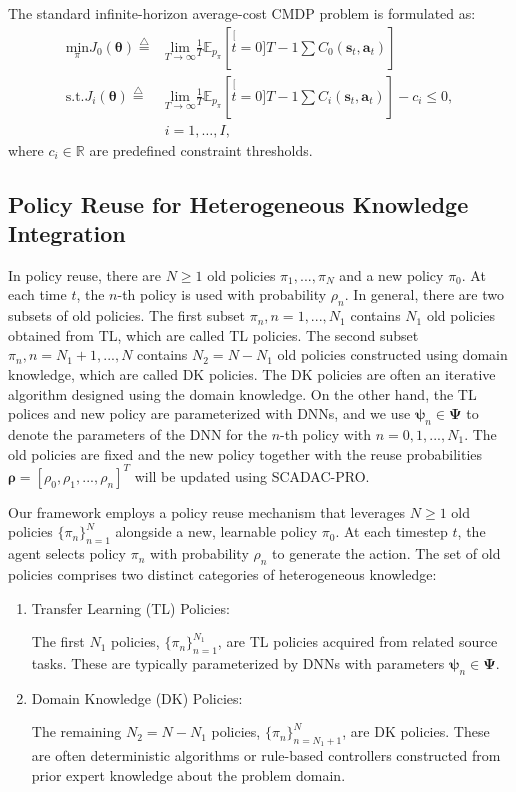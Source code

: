 \documentclass{IEEEtran}
\begin{document}
The standard infinite-horizon average-cost CMDP problem is formulated as:
\begin{align}
\underset{\pi}{\mathrm{min}}J_{0}\left(\boldsymbol{\theta}\right)\overset{\triangle}{=} & \underset{T\rightarrow\infty}{\mathrm{lim}}\frac{1}{T}\mathbb{E}_{p_{\pi}}\left[\stackrel[t=0]{T-1}{\sum}C_{0}\left(\boldsymbol{s}_{t},\boldsymbol{a}_{t}\right)\right]\label{eq:problem 1}\\
\mathrm{s.t.}J_{i}\left(\boldsymbol{\theta}\right)\overset{\triangle}{=} & \underset{T\rightarrow\infty}{\mathrm{lim}}\frac{1}{T}\mathbb{E}_{p_{\pi}}\left[\stackrel[t=0]{T-1}{\sum}C_{i}\left(\boldsymbol{s}_{t},\boldsymbol{a}_{t}\right)\right]-c_{i}\leq0,\nonumber \\
& i=1,\ldots,I,\nonumber
\end{align}
where $c_{i}\in\mathbb{R}$ are predefined constraint thresholds.

\subsection{Policy Reuse for Heterogeneous Knowledge Integration}
In policy reuse, there are $N\geq1$ old policies $\pi_{1},...,\pi_{N}$ and a new policy $\pi_{0}$. At each time $t$, the $n$-th policy is used with probability $\rho_{n}$. In general, there are two subsets of old policies. The first subset $\pi_{n},n=1,...,N_{1}$ contains $N_{1}$ old policies obtained from TL, which are called TL policies. The second subset $\pi_{n},n=N_{1}+1,...,N$ contains $N_{2}=N-N_{1}$ old policies constructed using domain knowledge, which are called DK policies. The DK policies are often an iterative algorithm designed using the domain knowledge. On the other hand, the TL polices and new policy are parameterized with DNNs, and we use $\boldsymbol{\psi}_{n}\in\boldsymbol{\Psi}$ to denote the parameters of the DNN for the $n$-th policy with $n=0,1,...,N_{1}$. The old policies are fixed and the new policy together with the reuse probabilities $\boldsymbol{\rho}=\left[\rho_{0},\rho_{1},...,\rho_{n}\right]^{T}$ will be updated using SCADAC-PRO.

Our framework employs a policy reuse mechanism that leverages $N\geq1$ old policies $\{\pi_{n}\}_{n=1}^{N}$ alongside a new, learnable policy $\pi_{0}$. At each timestep $t$, the agent selects policy $\pi_{n}$ with probability $\rho_{n}$ to generate the action. The set of old policies comprises two distinct categories of heterogeneous knowledge:

\begin{enumerate}
\item Transfer Learning (TL) Policies:

The first $N_{1}$ policies, $\{\pi_{n}\}_{n=1}^{N_{1}}$, are TL policies acquired from related source tasks. These are typically parameterized by DNNs with parameters $\boldsymbol{\psi}_{n}\in\boldsymbol{\Psi}$.
\item Domain Knowledge (DK) Policies:

The remaining $N_{2}=N-N_{1}$ policies, $\{\pi_{n}\}_{n=N_{1}+1}^{N}$, are DK policies. These are often deterministic algorithms or rule-based controllers constructed from prior expert knowledge about the problem domain.
\end{enumerate}
\end{document}
